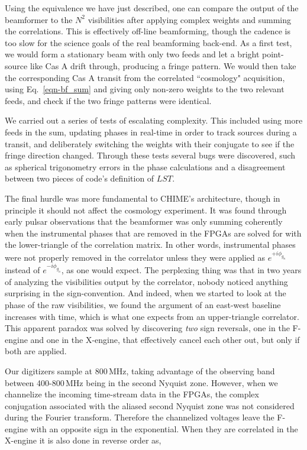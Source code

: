 Using the equivalence we have just described, one can compare the 
output of the beamformer to 
the $N^2$ visibilities after applying complex 
weights and summing the correlations. This is effectively 
off-line beamforming, though the cadence is too slow for 
the science goals of the real beamforming 
back-end.
As a first test, 
we would form a stationary beam with only two feeds and let a 
bright point-source like Cas A drift through, 
producing a fringe pattern. We would then take 
the corresponding Cas A transit from the correlated ``cosmology" 
acquisition, using Eq.~\ref{eqn-bf_sum} and giving only non-zero 
weights to the two relevant feeds, and check if the two
fringe patterns were identical. 

We carried out a series 
of tests of escalating complexity. 
This included using more feeds in the sum, updating 
phases in real-time in order to track sources during a transit, and deliberately 
switching the weights with their conjugate to see if the fringe 
direction changed. Through these tests several bugs were discovered, 
such as spherical trigonometry errors in the phase 
calculations and a disagreement between two pieces of code's 
definition of $LST$. 

The final hurdle was more fundamental to CHIME's architecture,
though in principle it should not affect the cosmology experiment. 
It was found through 
early pulsar observations that the beamformer was only summing
coherently when the instrumental phases that are removed in 
the FPGAs are solved for with the lower-triangle of the correlation 
matrix. In other words, instrumental phases were not properly 
removed in the correlator unless they were applied as 
$e^{+i\phi_{g_n}}$ instead of $e^{-i\phi_{g_n}}$, as one would expect.
The perplexing thing was that in two years of analyzing 
the visibilities output by the correlator, nobody noticed anything  
surprising in the sign-convention. And indeed, when we started to look
at the phase of the raw visibilities, we found the argument 
of an east-west baseline increases with time, which is 
what one expects from an upper-triangle correlator. This 
apparent paradox was solved by discovering \textit{two} sign 
reversals, one in the F-engine and one in the X-engine, that
effectively cancel each other out, but only if both are applied. 

Our digitizers sample at 800\,MHz, taking advantage of the observing 
band between 400-800\,MHz being in the second Nyquist zone.
However, when we channelize
the incoming time-stream data in the FPGAs, the complex conjugation 
associated with the aliased second Nyquist zone was not considered during the 
Fourier transform. Therefore the channelized voltages leave the F-engine 
with an opposite sign in the exponential. When they are correlated
in the X-engine it is also done in reverse order as, 

